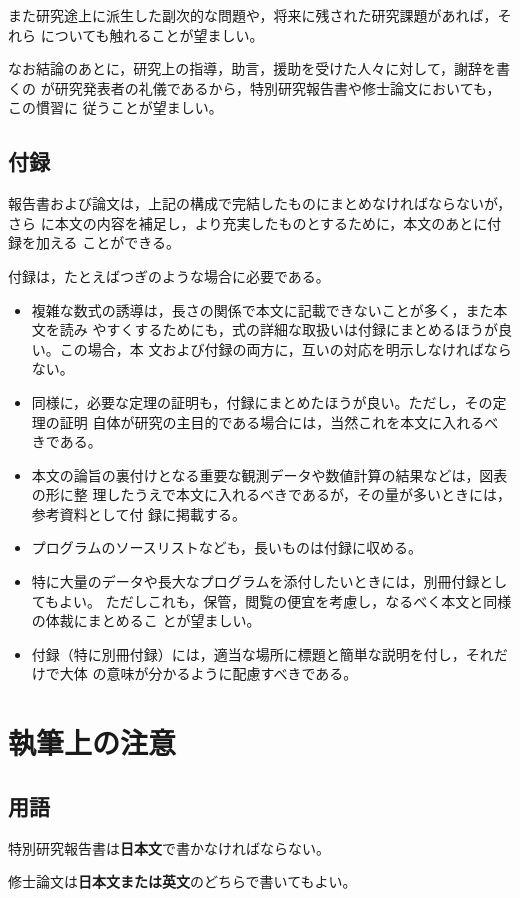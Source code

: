 \documentclass{kuisthesis}			%
\let\EM\bf
\begin{document}
また研究途上に派生した副次的な問題や，将来に残された研究課題があれば，それら
についても触れることが望ましい。

なお結論のあとに，研究上の指導，助言，援助を受けた人々に対して，謝辞を書くの
が研究発表者の礼儀であるから，特別研究報告書や修士論文においても，この慣習に
従うことが望ましい。

\subsection{付録}\label{subsec-appendix}
報告書および論文は，上記の構成で完結したものにまとめなければならないが，さら
に本文の内容を補足し，より充実したものとするために，本文のあとに付録を加える
ことができる。

付録は，たとえばつぎのような場合に必要である。
\begin{itemize}%
\item
複雑な数式の誘導は，長さの関係で本文に記載できないことが多く，また本文を読み
やすくするためにも，式の詳細な取扱いは付録にまとめるほうが良い。この場合，本
文および付録の両方に，互いの対応を明示しなければならない。
\item
同様に，必要な定理の証明も，付録にまとめたほうが良い。ただし，その定理の証明
自体が研究の主目的である場合には，当然これを本文に入れるべきである。
\item
本文の論旨の裏付けとなる重要な観測データや数値計算の結果などは，図表の形に整
理したうえで本文に入れるべきであるが，その量が多いときには，参考資料として付
録に掲載する。
\item
プログラムのソースリストなども，長いものは付録に収める。
\item
特に大量のデータや長大なプログラムを添付したいときには，別冊付録としてもよい。
ただしこれも，保管，閲覧の便宜を考慮し，なるべく本文と同様の体裁にまとめるこ
とが望ましい。
\item
付録（特に別冊付録）には，適当な場所に標題と簡単な説明を付し，それだけで大体
の意味が分かるように配慮すべきである。
\end{itemize}%

\section{執筆上の注意}\label{sec-instruction}
\subsection{用語}\label{subsec-language}
特別研究報告書は{\EM 日本文}で書かなければならない。

修士論文は{\EM 日本文または英文}のどちらで書いてもよい。
\end{document}
